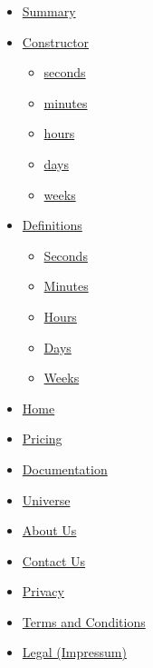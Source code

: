 \begin{itemize}
\tightlist
\item
  \hyperref[summary]{Summary}
\item
  \hyperref[constructor]{Constructor}

  \begin{itemize}
  \tightlist
  \item
    \hyperref[constructor-seconds]{seconds}
  \item
    \hyperref[constructor-minutes]{minutes}
  \item
    \hyperref[constructor-hours]{hours}
  \item
    \hyperref[constructor-days]{days}
  \item
    \hyperref[constructor-weeks]{weeks}
  \end{itemize}
\item
  \hyperref[definitions]{Definitions}

  \begin{itemize}
  \tightlist
  \item
    \hyperref[definitions-seconds]{Seconds}
  \item
    \hyperref[definitions-minutes]{Minutes}
  \item
    \hyperref[definitions-hours]{Hours}
  \item
    \hyperref[definitions-days]{Days}
  \item
    \hyperref[definitions-weeks]{Weeks}
  \end{itemize}
\end{itemize}

\begin{itemize}
\tightlist
\item
  \href{/}{Home}
\item
  \href{/pricing/}{Pricing}
\item
  \href{/docs/}{Documentation}
\item
  \href{/universe/}{Universe}
\item
  \href{/about/}{About Us}
\item
  \href{/contact/}{Contact Us}
\item
  \href{/privacy/}{Privacy}
\item
  \href{https://typst.app/terms}{Terms and Conditions}
\item
  \href{/legal/}{Legal (Impressum)}
\end{itemize}

